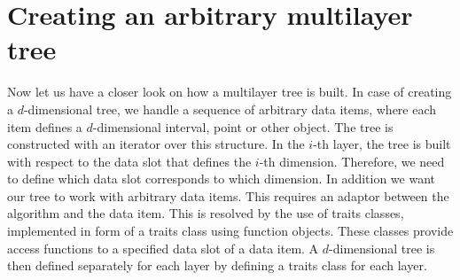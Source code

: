 \section{Creating an arbitrary multilayer tree}
\label{general}

Now let us have a closer look on how a multilayer tree is built.
In case of creating a $d$-dimensional tree,  we handle a
sequence of arbitrary data
items, where each item  defines a $d$-dimensional interval, point
or other object. The tree is constructed with an iterator over
this structure. In the $i$-th layer, the tree is
built with respect to the data slot that defines the $i$-th
dimension. Therefore, we need to define which data slot
corresponds to which dimension.
In addition we want our tree to work with arbitrary data items.
This requires an
adaptor between the algorithm and the data item. This is resolved
by the use of traits classes, implemented in
form of a traits class using
function objects.
These classes provide
access functions to a specified data slot of a data item.
A $d$-dimensional tree is then defined separately for each layer by
defining a traits class for each layer.

